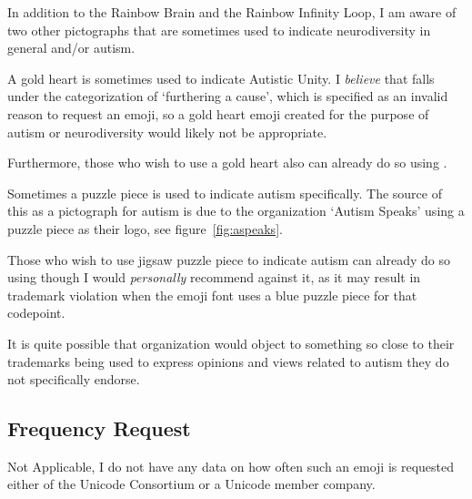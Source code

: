 In addition to the Rainbow Brain and the Rainbow Infinity Loop, I am aware of two other pictographs
that are sometimes used to indicate neurodiversity in general and/or autism.

A gold heart is sometimes used to indicate Autistic Unity. I \emph{believe} that falls under the
categorization of `furthering a cause', which is specified as an invalid reason to request an emoji,
so a gold heart emoji created for the purpose of autism or neurodiversity would likely not be
appropriate.

Furthermore, those who wish to use a gold heart also can already do so using \goldheart{}.

Sometimes a puzzle piece is used to indicate autism specifically. The source of this as a pictograph
for autism is due to the organization `Autism Speaks' using a puzzle piece as their logo, see
figure~\ref{fig:aspeaks}.

Those who wish to use jigsaw puzzle piece to indicate autism can already do so using \jigsawemoji{}
though I would \emph{personally} recommend against it, as it may result in trademark violation when
the emoji font uses a blue puzzle piece for that codepoint.

It is quite possible that organization would object to something so close to their trademarks
being used to express opinions and views related to autism they do not specifically endorse.

\subsection{Frequency Request}

Not Applicable, I do not have any data on how often such an emoji is requested either of the
Unicode Consortium or a Unicode member company.
